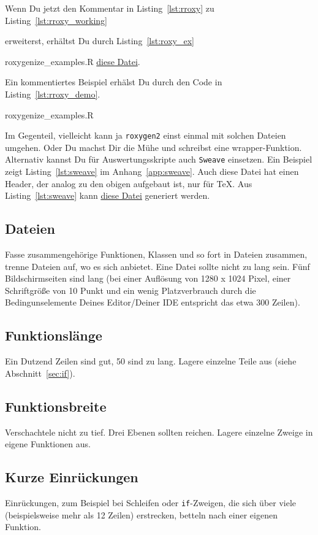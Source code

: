 \documentclass[twoside]{scrartcl}
\providecommand{\code}[1]{\texttt{#1}}
\begin{document}
Wenn Du jetzt den Kommentar in  Listing~\ref{lst:rroxy} zu
Listing~\ref{lst:rroxy_working} 

erweiterst, erh\"altst Du durch
Listing~\ref{lst:roxy_ex} 

{roxygenize_examples.R}
\href{r_roxygen.pdf}{diese Datei}.  

Ein kommentiertes Beispiel erh\"a{}lst Du
durch den Code in Listing~\ref{lst:rroxy_demo}. 

{roxygenize_examples.R}

\else 
Im Gegenteil, vielleicht kann ja \code{roxygen2} einst einmal mit solchen
Dateien umgehen. Oder Du machst Dir die M\"u{}he und schreibst eine
wrapper-Funktion.
\fi
{} Alternativ kannst Du f\"u{}r Auswertungsskripte auch
\code{Sweave} einsetzen. Ein Beispiel zeigt Listing~\ref{lst:sweave} im
Anhang~\ref{app:sweave}.
Auch diese Datei hat einen Header, der analog zu den obigen aufgebaut ist, nur
f\"u{}r \TeX{}.
Aus  Listing~\ref{lst:sweave} kann \href{template.pdf}{diese Datei} generiert
werden. 
\subsection{Dateien} Fasse zusammengeh\"o{}rige Funktionen, Klassen und
so fort in Dateien zusammen, trenne Dateien auf, wo es sich anbietet.
Eine Datei sollte nicht zu lang sein. F\"u{}nf Bildschirmseiten sind
lang (bei einer Aufl\"o{}sung von 1280 x 1024 Pixel, einer
Schriftgr\"o{}\ss{}e von 10 Punkt und ein wenig Platzverbrauch durch die
Bedingunselemente Deines Editor/Deiner IDE entspricht das etwa 300
Zeilen).

\subsection{Funktionsl\"a{}nge} Ein Dutzend Zeilen sind gut, 50 sind zu lang.
Lagere einzelne Teile aus (siehe Abschnitt~\ref{sec:if}).

\subsection{Funktionsbreite\label{sec:breite}} Verschachtele nicht zu tief. Drei
Ebenen sollten reichen. Lagere einzelne Zweige in eigene Funktionen aus.

\subsection{Kurze Einr\"u{}ckungen} Einr\"u{}ckungen, zum Beispiel bei Schleifen
oder \code{if}-Zweigen,
die sich \"u{}ber viele (beispielsweise mehr als 12 Zeilen) erstrecken, betteln
nach einer eigenen Funktion.
\end{document}
